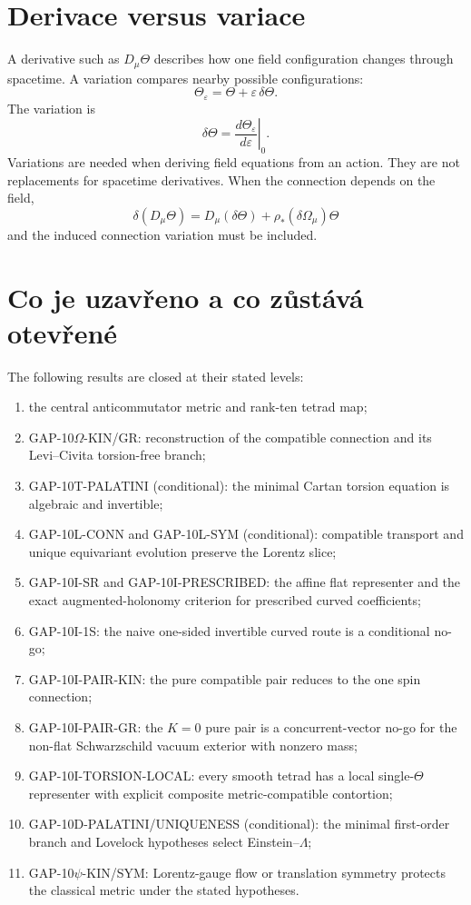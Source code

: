 \section{Derivace versus variace}
A derivative such as $D_\mu\Theta$ describes how one field configuration changes
through spacetime.  A variation compares nearby possible configurations:
\[
 \Theta_\varepsilon=\Theta+\varepsilon\,\delta\Theta.
\]
The variation is
\[
 \delta\Theta=
 \left.\frac{d\Theta_\varepsilon}{d\varepsilon}\right|_{0}.
\]
Variations are needed when deriving field equations from an action.  They are
not replacements for spacetime derivatives.  When the connection depends on
the field,
\[
 \delta(D_\mu\Theta)
 =D_\mu(\delta\Theta)+\rho_*(\delta\Omega_\mu)\Theta
\]
and the induced connection variation must be included.

\section{Co je uzavřeno a co zůstává otevřené}
The following results are closed at their stated levels:
\begin{enumerate}
 \item the central anticommutator metric and rank-ten tetrad map;
 \item GAP-10$\Omega$-KIN/GR: reconstruction of the compatible connection and
       its Levi--Civita torsion-free branch;
 \item GAP-10T-PALATINI (conditional): the minimal Cartan torsion equation is
       algebraic and invertible;
 \item GAP-10L-CONN and GAP-10L-SYM (conditional): compatible transport and
       unique equivariant evolution preserve the Lorentz slice;
 \item GAP-10I-SR and GAP-10I-PRESCRIBED: the affine flat representer and the
       exact augmented-holonomy criterion for prescribed curved coefficients;
 \item GAP-10I-1S: the naive one-sided invertible curved route is a conditional
       no-go;
 \item GAP-10I-PAIR-KIN: the pure compatible pair reduces to the one spin
       connection;
 \item GAP-10I-PAIR-GR: the $K=0$ pure pair is a concurrent-vector no-go
       for the non-flat Schwarzschild vacuum exterior with nonzero mass;
 \item GAP-10I-TORSION-LOCAL: every smooth tetrad has a local single-$\Theta$
       representer with explicit composite metric-compatible contortion;
 \item GAP-10D-PALATINI/UNIQUENESS (conditional): the minimal first-order
       branch and Lovelock hypotheses select Einstein--$\Lambda$;
 \item GAP-10$\psi$-KIN/SYM: Lorentz-gauge flow or translation symmetry
       protects the classical metric under the stated hypotheses.
\end{enumerate}


